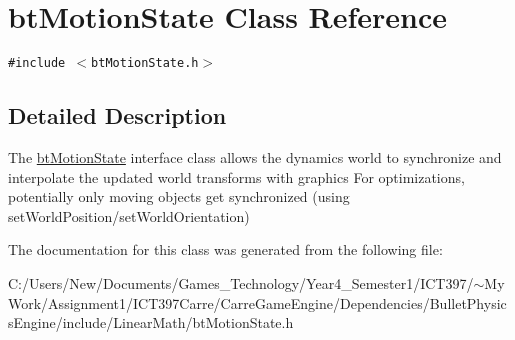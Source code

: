 \hypertarget{classbt_motion_state}{
\section{btMotionState Class Reference}
\label{classbt_motion_state}
}
{\tt \#include $<$btMotionState.h$>$}



\subsection{Detailed Description}
The \hyperlink{classbt_motion_state}{btMotionState} interface class allows the dynamics world to synchronize and interpolate the updated world transforms with graphics For optimizations, potentially only moving objects get synchronized (using setWorldPosition/setWorldOrientation) 

The documentation for this class was generated from the following file:\begin{CompactItemize}
\item 
C:/Users/New/Documents/Games\_\-Technology/Year4\_\-Semester1/ICT397/$\sim$My Work/Assignment1/ICT397Carre/CarreGameEngine/Dependencies/BulletPhysicsEngine/include/LinearMath/btMotionState.h\end{CompactItemize}
